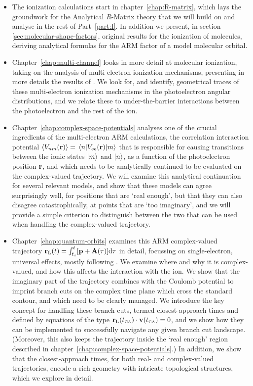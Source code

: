 \begin{itemize}

\item
The ionization calculations start in chapter~\ref{chap:R-matrix}, which lays the groundwork for the Analytical $R$-Matrix theory that we will build on and analyse in the rest of Part~\ref{part:I}. In addition we present, in section \ref{sec:molecular-shape-factors}, original results for the ionization of molecules, deriving analytical formulas for the ARM factor of a model molecular orbital.

\item
Chapter~\ref{chap:multi-channel} looks in more detail at molecular ionization, taking on the analysis of multi-electron ionization mechanisms, presenting in more details the results of . We look for, and identify, geometrical traces of these multi-electron ionization mechanisms in the photoelectron angular distributions, and we relate these to under-the-barrier interactions between the photoelectron and the rest of the ion.

\item
Chapter~\ref{chap:complex-space-potentials} analyses one of the crucial ingredients of the multi-electron ARM calculations, the correlation interaction potential $\Vnm{\vbr}=\matrixel{n}{V_{ee}(\vbr)}{m}$ that is responsible for causing transitions between the ionic states $\ket{m}$ and $\ket{n}$, as a function of the photoelectron position $\vb{r}$, and which needs to be analytically continued to be evaluated on the complex-valued trajectory. We will examine this analytical continuation for several relevant models, and show that these models can agree surprisingly well, for positions that are `real enough', but that they can also disagree catastrophically, at points that are `too imaginary', and we will provide a simple criterion to distinguish between the two that can be used when handling the complex-valued trajectory.

\item
Chapter~\ref{chap:quantum-orbits} examines this ARM complex-valued trajectory $\vb{r}_\mathrm{L}(t) = \int_{{t_s}}^t [\vb{p}+\vb{A}(\tau)]\mathrm{d}\tau$ in detail, focussing on single-electron, universal effects, mostly following . We examine where and why it is complex-valued, and how this affects the interaction with the ion. We show that the imaginary part of the trajectory combines with the Coulomb potential to imprint branch cuts on the complex time plane which cross the standard contour, and which need to be clearly managed. We introduce the key concept for handling these branch cuts, termed closest-approach times and defined by equations of the type $\vb{r}_\mathrm{L}({t_{\scriptscriptstyle\mathrm{CA}}})\cdot\vb{v}({t_{\scriptscriptstyle\mathrm{CA}}})=0$, and we show how they can be implemented to successfully navigate any given branch cut landscape. (Moreover, this also keeps the trajectory inside the `real enough' region described in chapter~\ref{chap:complex-space-potentials}.) In addition, we show that the closest-approach times, for both real- and complex-valued trajectories, encode a rich geometry with intricate topological structures, which we explore in detail.


\end{itemize}
